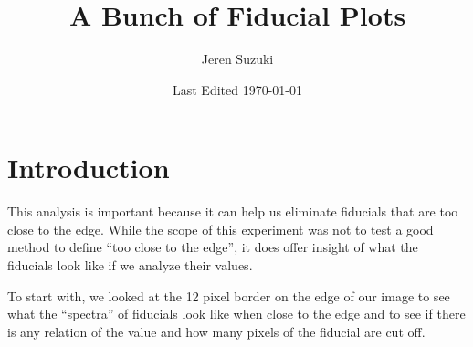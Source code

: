 \documentclass[10pt]{article}
\title{A Bunch of Fiducial Plots}
\author{Jeren Suzuki}
\date{Last Edited \today}
\begin{document}
\maketitle
{}
\tableofcontents
\newpage
{}

\section{Introduction} %
\label{sec:introduction}

This analysis is important because it can help us eliminate fiducials that are too close to the edge. While the scope of this experiment was not to test a good method to define ``too close to the edge'', it does offer insight of what the fiducials look like if we analyze their values.

To start with, we looked at the 12 pixel border on the edge of our image to see what the ``spectra'' of fiducials look like when close to the edge and to see if there is any relation of the value and how many pixels of the fiducial are cut off. 
\end{document}
